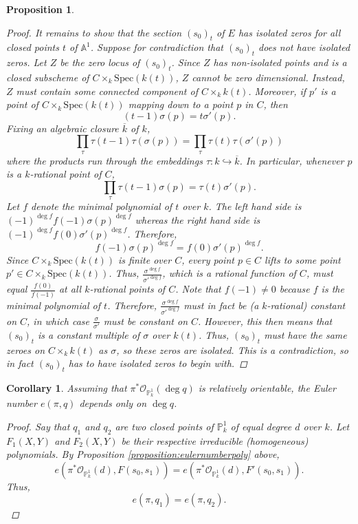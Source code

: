 \documentclass[12pt, reqno]{amsart}
\newtheorem{proposition}[theorem]{Proposition}
\newtheorem{corollary}[theorem]{Corollary}
\theoremstyle{definition}
\newcommand{\Spec}{\mathrm{Spec }} %
\begin{document}
\begin{proposition}
\begin{proof}
It remains to show that the section $(s_0)_t$ of $E$ has isolated zeros for all closed points $t$ of $\mathbb{A}^1$. Suppose for contradiction that $(s_0)_t$ does not have isolated zeros. Let $Z$ be the zero locus of $(s_0)_t$. Since $Z$ has non-isolated points and is a closed subscheme of $C \times_k \Spec(k(t))$, $Z$ cannot be zero dimensional. Instead, $Z$ must contain some connected component of $C \times_k k(t)$. Moreover, if $p'$ is a point of $C \times_k \Spec(k(t))$ mapping down to a point $p$ in $C$, then 
$$(t-1) \sigma(p) = t \sigma'(p).$$
Fixing an algebraic closure $\overline{k}$ of $k$, 
$$\prod_\tau \tau(t-1) \tau(\sigma(p)) = \prod_\tau \tau(t) \tau(\sigma'(p))$$
where the products run through the embeddings $\tau:k \hookrightarrow \overline{k}$. In particular, whenever $p$ is a $k$-rational point of $C$,
$$\prod_\tau \tau(t-1) \sigma(p) = \tau(t) \sigma'(p).$$
Let $f$ denote the minimal polynomial of $t$ over $k$. The left hand side is $(-1)^{\deg f} f(-1) \sigma(p)^{\deg f}$ whereas the right hand side is $(-1)^{\deg f} f(0) \sigma'(p)^{\deg f}$. Therefore,
$$f(-1) \sigma(p)^{\deg f} = f(0) \sigma'(p)^{\deg f}.$$
Since $C \times_k \Spec(k(t))$ is finite over $C$, every point $p \in C$ lifts to some point $p' \in C \times_k \Spec(k(t))$. Thus, $\frac{\sigma^{\deg f}}{\sigma'^{\deg f}}$, which is a rational function of $C$, must equal $\frac{f(0)}{f(-1)}$ at all $k$-rational points of $C$. Note that $f(-1) \neq 0$ because $f$ is the minimal polynomial of $t$. Therefore, $\frac{\sigma^{\deg f}}{\sigma'^{\deg f}}$ must in fact be (a $k$-rational) constant on $C$, in which case $\frac{\sigma}{\sigma'}$ must be constant on $C$. %
However, this then means that $(s_0)_t$ is a constant multiple of $\sigma$ over $k(t)$. Thus, $(s_0)_t$ must have the same zeroes on $C \times_k k(t)$ as $\sigma$, so these zeros are isolated. This is a contradiction, so in fact $(s_0)_t$ has to have isolated zeros to begin with.
\end{proof} 
\end{proposition}

\begin{corollary} \label{euler deg independent}
Assuming that $\pi^*\mathscr{O}_{\mathbb{P}^1_k}(\deg q)$ is relatively orientable, the Euler number $e(\pi, q)$ depends only on $\deg q$. 
\begin{proof}
Say that $q_1$ and $q_2$ are two closed points of $\mathbb{P}^1_k$ of equal degree $d$ over $k$. Let $F_1(X,Y)$ and $F_2(X,Y)$ be their respective irreducible (homogeneous) polynomials. By Proposition \ref{proposition:eulernumberpoly} above, 
$$e(\pi^* \mathscr{O}_{\mathbb{P}^1_k}(d), F(s_0,s_1)) = e(\pi^* \mathscr{O}_{\mathbb{P}^1_k}(d), F'(s_0,s_1)).$$
Thus,
$$e(\pi,q_1) = e(\pi,q_2).$$
\end{proof}
\end{corollary}
\end{document}
